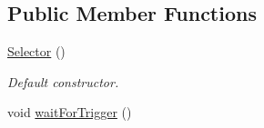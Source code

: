 \subsection*{Public Member Functions}
\begin{DoxyCompactItemize}
\item 
\hypertarget{classmognetwork_1_1_selector_ac2dc59256b3b676a6c04102f5ea5515a}{\hyperlink{classmognetwork_1_1_selector_ac2dc59256b3b676a6c04102f5ea5515a}{Selector} ()}\label{classmognetwork_1_1_selector_ac2dc59256b3b676a6c04102f5ea5515a}

\begin{DoxyCompactList}\small\item\em Default constructor. \end{DoxyCompactList}\item 
\hypertarget{classmognetwork_1_1_selector_aba14d0165c8b6408e75a8a7db3cbffb7}{void \hyperlink{classmognetwork_1_1_selector_aba14d0165c8b6408e75a8a7db3cbffb7}{wait\-For\-Trigger} ()}\label{classmognetwork_1_1_selector_aba14d0165c8b6408e75a8a7db3cbffb7}


\end{DoxyCompactItemize}
